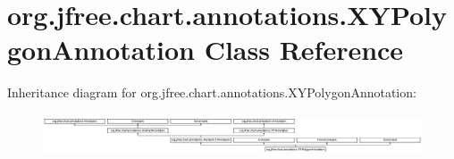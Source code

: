 \hypertarget{classorg_1_1jfree_1_1chart_1_1annotations_1_1_x_y_polygon_annotation}{}\section{org.\+jfree.\+chart.\+annotations.\+X\+Y\+Polygon\+Annotation Class Reference}
\label{classorg_1_1jfree_1_1chart_1_1annotations_1_1_x_y_polygon_annotation}
Inheritance diagram for org.\+jfree.\+chart.\+annotations.\+X\+Y\+Polygon\+Annotation\+:\begin{figure}[H]
\begin{center}
\leavevmode
\includegraphics[height=1.248607cm]{classorg_1_1jfree_1_1chart_1_1annotations_1_1_x_y_polygon_annotation}
\end{center}
\end{figure}
